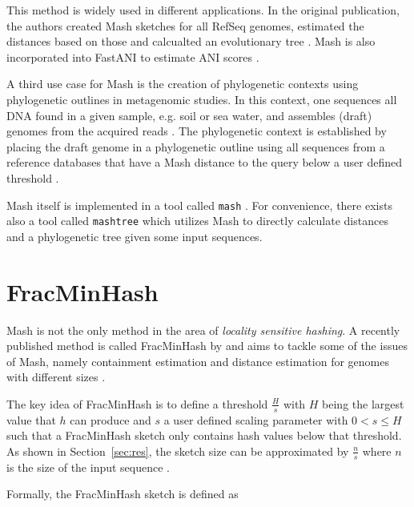 This method is widely used in different applications. In the original
publication, the authors created Mash sketches for all RefSeq genomes, estimated
the distances based on those and calcualted an evolutionary tree
\cite{ondovMashFastGenome2016}. Mash is also incorporated into FastANI to
estimate ANI scores \cite{jainHighThroughputANI2018}.

A third use case for Mash is the creation of phylogenetic contexts using
phylogenetic outlines \cite{bagciMicrobialPhylogeneticContext2021} in
metagenomic studies. In this context, one sequences all DNA found in a given
sample, e.g. soil or sea water, and assembles (draft) genomes from the acquired
reads \cite{kuninBioinformaticianGuideMetagenomics2008}. The phylogenetic
context is established by placing the draft genome in a phylogenetic outline
using all sequences from a reference databases that have a Mash distance to the
query below a user defined threshold
\cite{bagciMicrobialPhylogeneticContext2021}.

Mash itself is implemented in a tool called \texttt{mash}
\cite{ondovMashFastGenome2016}. For convenience, there exists also a tool called
\texttt{mashtree} \cite{katzMashtreeRapidComparison2019} which utilizes Mash to
directly calculate distances and a phylogenetic tree given some input sequences.

\section{FracMinHash}
Mash is not the only method in the area of \textit{locality sensitive hashing}.
A recently published method is called FracMinHash by
\cite{irberLightweightCompositionalAnalysis2022} and aims to tackle some of the
issues of Mash, namely containment estimation and distance estimation for
genomes with different sizes
\cite{heraDerivingConfidenceIntervals2023,koslickiImprovingMinHashContainment2019}.

The key idea of FracMinHash is to define a threshold $\frac{H}{s}$ with $H$
being the largest value that $h$ can produce and $s$ a user defined scaling
parameter with $0 < s \leq H$ such that a FracMinHash sketch only contains hash
values below that threshold. As shown in Section~\ref{sec:res}, the sketch size
can be approximated by $\frac{n}{s}$ where $n$ is the size of the input sequence
\cite{irberLightweightCompositionalAnalysis2022,heraDerivingConfidenceIntervals2023}.


Formally, the FracMinHash sketch is defined as 

